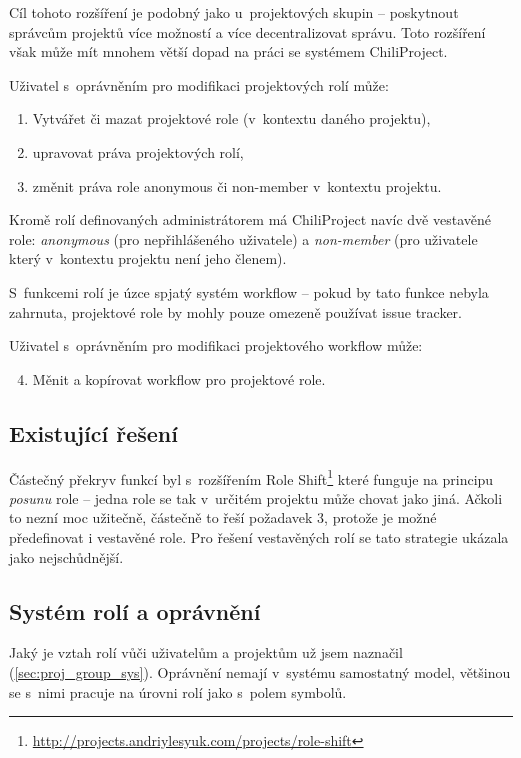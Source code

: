 \documentclass[thesis=B,czech]{FITthesis}[2012/05/02]
\begin{document}
Cíl tohoto rozšíření je podobný jako u~projektových skupin -- poskytnout
správcům projektů více možností a více decentralizovat správu. Toto
rozšíření však může mít mnohem větší dopad na práci se systémem
ChiliProject.

Uživatel s~oprávněním pro modifikaci projektových rolí může:

\begin{enumerate}[1.]
\item
  Vytvářet či mazat projektové role (v~kontextu daného projektu),
\item
  upravovat práva projektových rolí,
\item
  změnit práva role anonymous či non-member v~kontextu projektu.
\end{enumerate}
Kromě rolí definovaných administrátorem má ChiliProject navíc dvě
vestavěné role: \emph{anonymous} (pro nepřihlášeného uživatele) a
\emph{non-member} (pro uživatele který v~kontextu projektu není jeho
členem).

S~funkcemi rolí je úzce spjatý systém \gls{workflow} -- pokud by tato
funkce nebyla zahrnuta, projektové role by mohly pouze omezeně používat
issue tracker.

Uživatel s~oprávněním pro modifikaci projektového \gls{workflow} může:

\begin{enumerate}[1.]
\setcounter{enumi}{3}
\item
  Měnit a kopírovat workflow pro projektové role.
\end{enumerate}
\subsection{Existující řešení}

Částečný překryv funkcí byl s~rozšířením Role Shift\footnote{\url{http://projects.andriylesyuk.com/projects/role-shift}}
které funguje na principu \emph{posunu} role -- jedna role se tak
v~určitém projektu může chovat jako jiná. Ačkoli to nezní moc užitečně,
částečně to řeší požadavek 3, protože je možné předefinovat i vestavěné
role. Pro řešení vestavěných rolí se tato strategie ukázala jako
nejschůdnější.

\subsection{Systém rolí a oprávnění}

Jaký je vztah rolí vůči uživatelům a projektům už jsem naznačil
(\ref{sec:proj_group_sys}). Oprávnění nemají v~systému samostatný model,
většinou se s~nimi pracuje na úrovni rolí jako s~polem symbolů.
\end{document}
